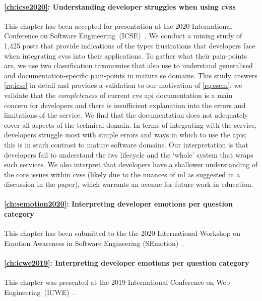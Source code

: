 \paragraph{\cref{ch:icse2020}: Understanding developer struggles when using \glspl{cvs}} This chapter has been accepted for presentation at the 2020 International Conference on Software Engineering~(ICSE)~\citep{Cummaudo:2019icsme}. We conduct a mining study of 1,425  posts that provide indications of the types frustrations that developers face when integrating \glspl{cvs} into their applications. To gather what their pain-points are, we use two classification taxonomies that also use  to understand generalised and documentation-specific pain-points in mature \gls{se} domains. This study answers \ref{rq:icse} in detail and provides a validation to our motivation of \ref{rq:esem}: we validate that the \textit{completeness} of current \gls{cvs} \gls{api} documentation is a main concern for developers and there is insufficient explanation into the errors and limitations of the service. We find that the documentation does not adequately cover all aspects of the technical domain. In terms of integrating with the service, developers struggle most with simple errors and ways in which to use the \glspl{api}; this is in stark contrast to mature software domains. Our interpretation is that developers fail to understand the \gls{iws} lifecycle and the `whole' system that wraps such services. We also interpret that developers have a shallower understanding of the core issues within \glspl{cvs} (likely due to the nuances of \gls{ml} as suggested in a discussion in the paper), which warrants an avenue for future work in  education.

\paragraph{\cref{ch:semotion2020}: Interpreting developer emotions per question category} This chapter has been submitted to the the 2020 International Workshop on Emotion Awareness in Software Engineering (SEmotion)~\citep{Curumsing:2020semotion}. 

\paragraph{\cref{ch:icwe2019}: Interpreting developer emotions per question category} This chapter was presented at the 2019 International Conference on Web Engineering~(ICWE)~\citep{Ohtake:2019vi}.

